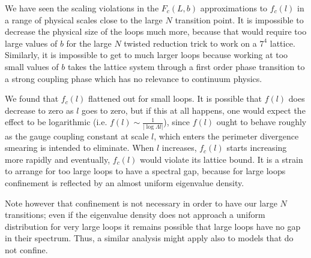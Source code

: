 We have seen the scaling violations in the $F_c(L,b)$
approximations to $f_c (l)$ in a range of physical scales close to
the large $N$ transition point. It is impossible to decrease the
physical size of the loops much more, because that would require
too large
values of $b$ for the large $N$ twisted reduction trick
to work on a $7^4$ lattice. Similarly, it is impossible to get to
much larger loops because working at too small values of $b$ takes
the lattice system through a first order phase transition to a
strong coupling phase which has no relevance to continuum physics.

We found that
$f_c(l)$ flattened out for small loops. It is possible that
$f(l)$ does decrease to zero as $l$ goes to zero, but if this at
all happens, one would expect the effect to be logarithmic (i.e.
$f(l) \sim\frac{1}{|\log \Lambda l|}$), since $f(l)$ ought to
behave roughly as the gauge coupling constant at scale $l$, which
enters the perimeter divergence smearing is intended to eliminate.
When $l$ increases, $f_c(l)$ starts increasing more rapidly and
eventually, $f_c(l)$ would violate its lattice bound. It is a
strain to arrange for too large loops to have a spectral gap,
because for large loops confinement is reflected by an almost
uniform eigenvalue density.

Note however that confinement is not necessary in order to have
our large $N$ transitions; even if the eigenvalue density does not
approach a uniform distribution for very large loops it remains
possible that large loops have no gap in their spectrum. Thus, a
similar analysis might apply also to models that do not confine.

